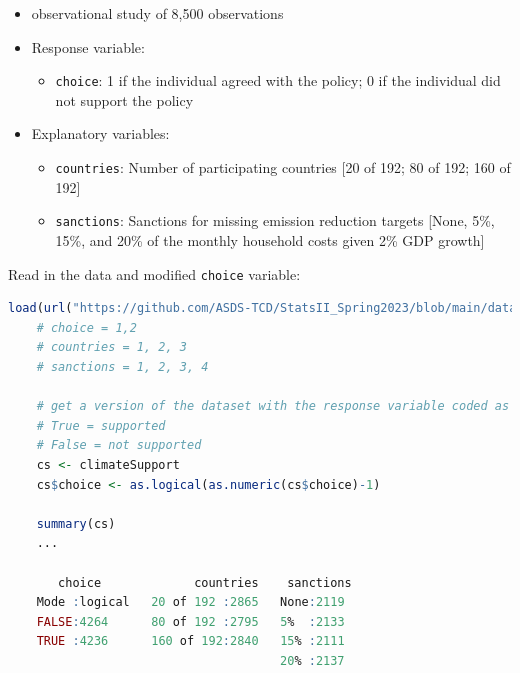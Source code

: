 \documentclass[12pt,letterpaper]{article}
\begin{document}
\begin{itemize}
  \item observational study of 8,500 observations
	\item Response variable: 
	\begin{itemize}
		\item \texttt{choice}: 1 if the individual agreed with the policy; 0 if the individual did not support the policy
	\end{itemize}
	\item Explanatory variables: 
	\begin{itemize}
		\item
		\texttt{countries}: Number of participating countries [20 of 192; 80 of 192; 160 of 192]
		\item
		\texttt{sanctions}: Sanctions for missing emission reduction targets [None, 5\%, 15\%, and 20\% of the monthly household costs given 2\% GDP growth]
		
	\end{itemize}
	
\end{itemize}

  Read in the data and modified \texttt{choice} variable:
  
    \begin{lstlisting}[language=R]
    load(url("https://github.com/ASDS-TCD/StatsII_Spring2023/blob/main/datasets/climateSupport.RData?raw=true"))
    # choice = 1,2
    # countries = 1, 2, 3
    # sanctions = 1, 2, 3, 4

    # get a version of the dataset with the response variable coded as 
    # True = supported
    # False = not supported
    cs <- climateSupport
    cs$choice <- as.logical(as.numeric(cs$choice)-1) 
    
    summary(cs)
    ...
    
       choice             countries    sanctions  
    Mode :logical   20 of 192 :2865   None:2119  
    FALSE:4264      80 of 192 :2795   5%  :2133  
    TRUE :4236      160 of 192:2840   15% :2111  
                                      20% :2137  
  \end{lstlisting}

\end{document}
